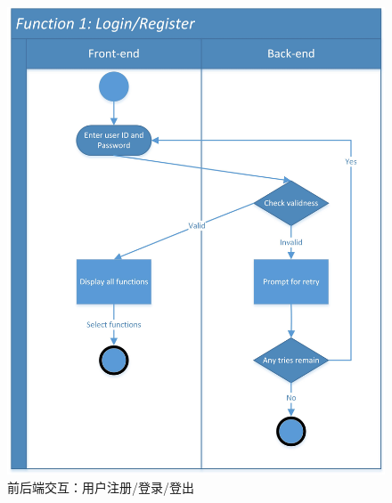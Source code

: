 \documentclass[twoside,11pt]{article}
\begin{document}
\begin{figure}[H]
    \centering
    \includegraphics[width=0.9\columnwidth]{SwimLaneDiagram/Usecase_1.jpg}
    \caption{前后端交互：用户注册/登录/登出}
    \label{fig:userlogin}
\end{figure}
\newpage
\end{document}
